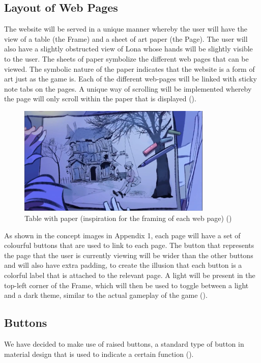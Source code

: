 \documentclass{article}
\begin{document}
    \subsection{Layout of Web Pages}
        \begin{flushleft}
        The website will be served in a unique manner whereby the user will have the view of a table (the Frame) and a sheet of art paper (the Page). The user will also have a slightly obstructed view of Lona whose hands will be slightly visible to the user. The sheets of paper symbolize the different web pages that can be viewed. The symbolic nature of the paper indicates that the website is a form of art just as the game is. Each of the different web-pages will be linked with sticky note tabs on the pages. A unique way of scrolling will be implemented whereby the page will only scroll within the paper that is displayed (\cite{youtube_Lona}).
        \bigskip
        \begin{figure}[h]
        \centering
        \caption{Table with paper (inspiration for the framing of each web page) (\cite{youtube_Lona}) }
        \includegraphics[width=350px]{Table.JPG}
        \end{figure}
        \end{flushleft}
    
    As shown in the concept images in Appendix 1, each page will have a set of colourful buttons that are used to link to each page. The button that represents the page that the user is currently viewing will be wider than the other buttons and will also have extra padding, to create the illusion that each button is a colorful label that is attached to the relevant page. A light will be present in the top-left corner of the Frame, which will then be used to toggle between a light and a dark theme, similar to the actual gameplay of the game (\cite{lonaweb}).
    
    \subsection{Buttons}
    We have decided to make use of raised buttons, a standard type of button in material design that is used to indicate a certain function (\cite{materialize}).
    
\end{document}
